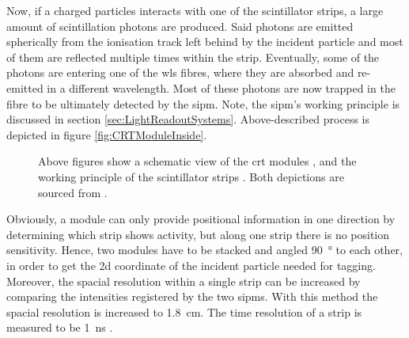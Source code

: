 Now, if a charged particles interacts with one of the scintillator strips, a large amount of scintillation photons are produced. Said photons are emitted spherically from the ionisation track left behind by the incident particle and most of them are reflected multiple times within the strip. Eventually, some of the photons are entering one of the \gls{wls} fibres, where they are absorbed and re-emitted in a different wavelength. Most of these photons are now trapped in the fibre to be ultimately detected by the \gls{sipm}. Note, the \gls{sipm}'s working principle is discussed in section \ref{sec:LightReadoutSystems}. Above-described process is depicted in figure \ref{fig:CRTModuleInside}.
\begin{figure}[htbp]
    \centering
    \caption[Working Principle of a CRT Module]{Above figures show a schematic view of the \gls{crt} modules , and the working principle of the scintillator strips . Both depictions are sourced from \cite{CRTThomasPhD}.}
    \label{fig:CRTWorkingPrinciple}
\end{figure}
Obviously, a module can only provide positional information in one direction by determining which strip shows activity, but along one strip there is no position sensitivity. Hence, two modules have to be stacked and angled \SI{90}{\degree} to each other, in order to get the \gls{2d} coordinate of the incident particle needed for tagging. Moreover, the spacial resolution within a single strip can be increased by comparing the intensities registered by the two \glspl{sipm}. With this method the spacial resolution is increased to \SI{1.8}{\centi\metre}. The time resolution of a strip is measured to be \SI{1}{\nano\second} \cite{CRTGeneral}.

